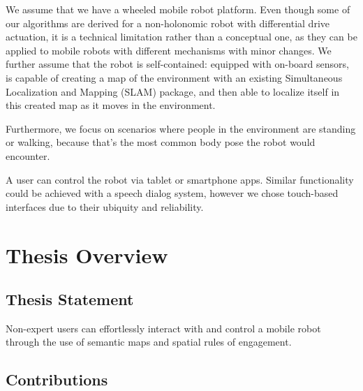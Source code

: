We assume that we have a wheeled mobile robot platform. Even though some of our algorithms are derived for a non-holonomic robot with differential drive actuation, it is a technical limitation rather than a conceptual one, as they can be applied to mobile robots with different mechanisms with minor changes. We further assume that the robot is self-contained: equipped with on-board sensors, is capable of creating a map of the environment with an existing Simultaneous Localization and Mapping (SLAM) package, and then able to localize itself in this created map as it moves in the environment.

Furthermore, we focus on scenarios where people in the environment are standing or walking, because that's the most common body pose the robot would encounter. 

A user can control the robot via tablet or smartphone apps. Similar functionality could be achieved with a speech dialog system, however we chose touch-based interfaces due to their ubiquity and reliability.

\section{Thesis Overview}
\subsection{Thesis Statement}


Non-expert users can effortlessly interact with and control a mobile robot through the use of semantic maps and spatial rules of engagement.

\subsection{Contributions}

